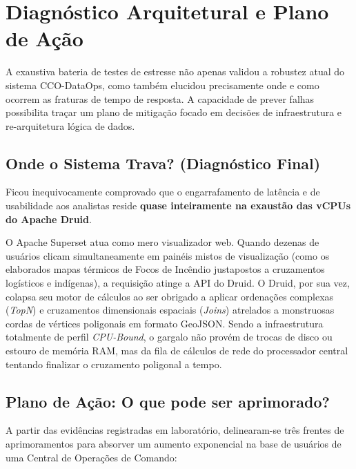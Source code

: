 \section{Diagnóstico Arquitetural e Plano de Ação}

A exaustiva bateria de testes de estresse não apenas validou a robustez atual do sistema CCO-DataOps, como também elucidou precisamente onde e como ocorrem as fraturas de tempo de resposta. A capacidade de prever falhas possibilita traçar um plano de mitigação focado em decisões de infraestrutura e re-arquitetura lógica de dados.

\subsection{Onde o Sistema Trava? (Diagnóstico Final)}
Ficou inequivocamente comprovado que o engarrafamento de latência e de usabilidade aos analistas reside \textbf{quase inteiramente na exaustão das vCPUs do Apache Druid}. 

O Apache Superset atua como mero visualizador web. Quando dezenas de usuários clicam simultaneamente em painéis mistos de visualização (como os elaborados mapas térmicos de Focos de Incêndio justapostos a cruzamentos logísticos e indígenas), a requisição atinge a API do Druid. O Druid, por sua vez, colapsa seu motor de cálculos ao ser obrigado a aplicar ordenações complexas (\textit{TopN}) e cruzamentos dimensionais espaciais (\textit{Joins}) atrelados a monstruosas cordas de vértices poligonais em formato GeoJSON. Sendo a infraestrutura totalmente de perfil \textit{CPU-Bound}, o gargalo não provém de trocas de disco ou estouro de memória RAM, mas da fila de cálculos de rede do processador central tentando finalizar o cruzamento poligonal a tempo.

\subsection{Plano de Ação: O que pode ser aprimorado?}

A partir das evidências registradas em laboratório, delinearam-se três frentes de aprimoramentos para absorver um aumento exponencial na base de usuários de uma Central de Operações de Comando:

